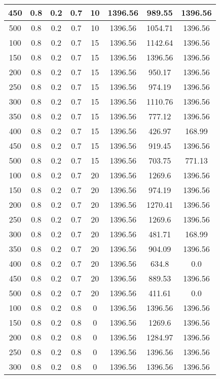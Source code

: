 \documentclass[a4paper, 12pt]{extreport}
\begin{document}
\begin{itemize}
\begin{longtable}{|c|c|c|c|c|c|c|c|}
			450 & 0.8 & 0.2 & 0.7 & 10 & 1396.56 & 989.55 & 1396.56 \\\hline
			500 & 0.8 & 0.2 & 0.7 & 10 & 1396.56 & 1054.71 & 1396.56 \\\hline
			100 & 0.8 & 0.2 & 0.7 & 15 & 1396.56 & 1142.64 & 1396.56 \\\hline
			150 & 0.8 & 0.2 & 0.7 & 15 & 1396.56 & 1396.56 & 1396.56 \\\hline
			200 & 0.8 & 0.2 & 0.7 & 15 & 1396.56 & 950.17 & 1396.56 \\\hline
			250 & 0.8 & 0.2 & 0.7 & 15 & 1396.56 & 974.19 & 1396.56 \\\hline
			300 & 0.8 & 0.2 & 0.7 & 15 & 1396.56 & 1110.76 & 1396.56 \\\hline
			350 & 0.8 & 0.2 & 0.7 & 15 & 1396.56 & 777.12 & 1396.56 \\\hline
			400 & 0.8 & 0.2 & 0.7 & 15 & 1396.56 & 426.97 & 168.99 \\\hline
			450 & 0.8 & 0.2 & 0.7 & 15 & 1396.56 & 919.45 & 1396.56 \\\hline
			500 & 0.8 & 0.2 & 0.7 & 15 & 1396.56 & 703.75 & 771.13 \\\hline
			100 & 0.8 & 0.2 & 0.7 & 20 & 1396.56 & 1269.6 & 1396.56 \\\hline
			150 & 0.8 & 0.2 & 0.7 & 20 & 1396.56 & 974.19 & 1396.56 \\\hline
			200 & 0.8 & 0.2 & 0.7 & 20 & 1396.56 & 1270.41 & 1396.56 \\\hline
			250 & 0.8 & 0.2 & 0.7 & 20 & 1396.56 & 1269.6 & 1396.56 \\\hline
			300 & 0.8 & 0.2 & 0.7 & 20 & 1396.56 & 481.71 & 168.99 \\\hline
			350 & 0.8 & 0.2 & 0.7 & 20 & 1396.56 & 904.09 & 1396.56 \\\hline
			400 & 0.8 & 0.2 & 0.7 & 20 & 1396.56 & 634.8 & 0.0 \\\hline
			450 & 0.8 & 0.2 & 0.7 & 20 & 1396.56 & 889.53 & 1396.56 \\\hline
			500 & 0.8 & 0.2 & 0.7 & 20 & 1396.56 & 411.61 & 0.0 \\\hline
			100 & 0.8 & 0.2 & 0.8 & 0 & 1396.56 & 1396.56 & 1396.56 \\\hline
			150 & 0.8 & 0.2 & 0.8 & 0 & 1396.56 & 1269.6 & 1396.56 \\\hline
			200 & 0.8 & 0.2 & 0.8 & 0 & 1396.56 & 1284.97 & 1396.56 \\\hline
			250 & 0.8 & 0.2 & 0.8 & 0 & 1396.56 & 1396.56 & 1396.56 \\\hline
			300 & 0.8 & 0.2 & 0.8 & 0 & 1396.56 & 1396.56 & 1396.56 \\\hline

\end{longtable}
\end{itemize}
\end{document}

